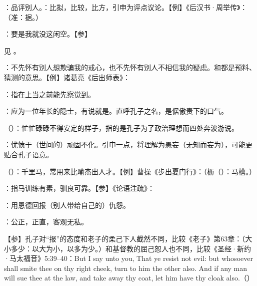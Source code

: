 {
\item {}：品评别人。：比拟，比较，比方，引申为评点议论。【例】《后汉书·周举传》：（准：据。）
\item {}：要是我就没这闲空。【参】   
}
{}


{见 。}
{}


{
\item {}：不先怀有别人想欺骗我的戒心，也不先怀有别人不相信我的疑虑。和都是预料、猜测的意思。【例】诸葛亮《后出师表》：
\item {}：指在上当之前能先察觉到。
}
{}


{
\item {}：应为一位年长的隐士，有说就是。直呼孔子之名，是倨傲责下的口气。
\item {}（）：忙忙碌碌不得安定的样子，指的是孔子为了政治理想而四处奔波游说。
\item {}：忧愤于（世间的）顽固不化。引申一点，将理解为愚妄（无知而妄为），可能更贴合孔子语意。
}
{}


{
\item {}（）：千里马，常用来比喻杰出人才。【例】曹操《步出夏门行》：（枥（）：马槽。）
\item {}：指马训练有素，驯良可靠。【参】《论语注疏》：
}
{}


{
\begin{lyitemize}
\item {}：用恩德回报（别人带给自己的）仇怨。
\item {}：公正，正直，客观无私。
\end{lyitemize}
【参】孔子对“报”的态度和老子的柔己下人截然不同，比较《老子》第63章：（大小多少：以大为小，以多为少。）和基督教的屈己恕人也不同，比较《圣经·新约·马太福音》5:39--40：But I say unto you, That ye resist not evil: but whosoever shall smite thee on thy right cheek, turn to him the other also. And if any man will sue thee at the law, and take away thy coat, let him have thy cloak also.（）
}
{}


